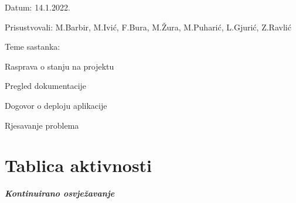 \begin{packed_enum}
\begin{packed_item}
	\item Datum: 14.1.2022.
	\item Prisustvovali: M.Barbir, M.Ivić, F.Bura, M.Žura, M.Puharić, L.Gjurić, Z.Ravlić
	\item Teme sastanka:
	\begin{packed_item}
		\item  Rasprava o stanju na projektu
		\item  Pregled dokumentacije
		\item  Dogovor o deploju aplikacije 
		\item  Rjesavanje problema
	\end{packed_item}
\end{packed_item}
			
		\end{packed_enum}
		
		\eject
		\section*{Tablica aktivnosti}
		
			\textbf{\textit{Kontinuirano osvježavanje}}\\
			

